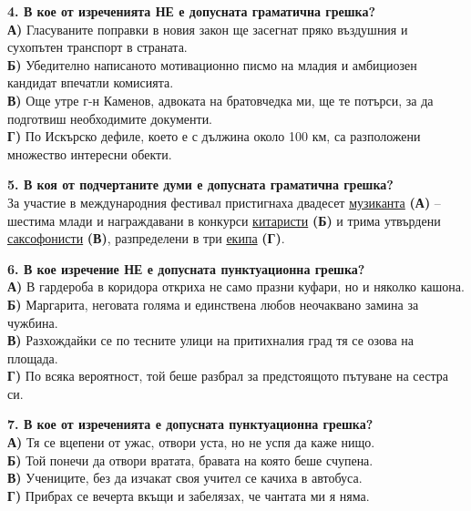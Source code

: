 \documentclass[12pt,a4paper]{article}
\begin{document}
\vspace{0.6cm}

\noindent
\textbf{4. В кое от изреченията НЕ е допусната граматична грешка?} \\
\noindent
\textbf{А)} Гласуваните поправки в новия закон ще засегнат пряко въздушния и сухопътен транспорт в страната. \\
\textbf{Б)} Убедително написаното мотивационно писмо на младия и амбициозен кандидат впечатли комисията. \\
\textbf{В)} Още утре г-н Каменов, адвоката на братовчедка ми, ще те потърси, за да подготвиш необходимите документи. \\
\textbf{Г)} По Искърско дефиле, което е с дължина около 100 км, са разположени множество интересни обекти.

\vspace{0.6cm}

\noindent
\textbf{5. В коя от подчертаните думи е допусната граматична грешка?} \\
\noindent
За участие в международния фестивал пристигнаха двадесет \underline{музиканта} \textbf{(А)} – шестима млади и награждавани в конкурси \underline{китаристи} \textbf{(Б)} и трима утвърдени \underline{саксофонисти} \textbf{(В)}, разпределени в три \underline{екипа} \textbf{(Г)}.

\vspace{0.6cm}

\noindent
\textbf{6. В кое изречение НЕ е допусната пунктуационна грешка?} \\
\noindent
\textbf{А)} В гардероба в коридора откриха не само празни куфари, но и няколко кашона. \\
\textbf{Б)} Маргарита, неговата голяма и единствена любов неочаквано замина за чужбина. \\
\textbf{В)} Разхождайки се по тесните улици на притихналия град тя се озова на площада. \\
\textbf{Г)} По всяка вероятност, той беше разбрал за предстоящото пътуване на сестра си.

\vspace{0.6cm}

\noindent
\textbf{7. В кое от изреченията е допусната пунктуационна грешка?} \\
\noindent
\textbf{А)} Тя се вцепени от ужас, отвори уста, но не успя да каже нищо. \\
\textbf{Б)} Той понечи да отвори вратата, бравата на която беше счупена. \\
\textbf{В)} Учениците, без да изчакат своя учител се качиха в автобуса. \\
\textbf{Г)} Прибрах се вечерта вкъщи и забелязах, че чантата ми я няма.
\end{document}
